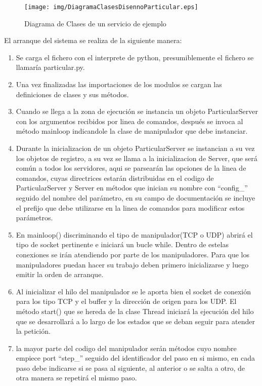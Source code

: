 \documentclass[a4paper,spanish,12pt]{book}
\begin{document}
\begin{figure}[h]
	\texttt{[image: img/DiagramaClasesDisennoParticular.eps]}
	\caption{Diagrama de Clases de un servicio de ejemplo} 
	      \label{fig:DiagramaClasesDiseñoParticular}
\end{figure}
El arranque del sistema se realiza de la siguiente manera:
\begin{enumerate}
	\item Se carga el fichero con el interprete de python, presumiblemente el fichero se llamaría particular.py.
	\item Una vez finalizadas las importaciones de los modulos se cargan las definiciones de clases y sus m\'etodos.
	\item Cuando se llega a la zona de ejecución se instancia un objeto ParticularServer con los argumentos recibidos por linea de comandos, despu\'es se invoca al m\'etodo mainloop indicandole la clase de manipulador que debe instanciar.
	\item Durante la inicializacion de un objeto ParticularServer se instancian a su vez los objetos de registro, a su vez se llama a la inicializacion de Server, que será común a todos los servidores, aqui se parsearán las opciones de la linea de comandos, cuyas directrices estarán distribuidas en el codigo de ParticularServer y Server en m\'etodos que inician su nombre con ``config\_'' seguido del nombre del parámetro, en su campo de documentación se incluye el prefijo que debe utilizarse en la linea de comandos para modificar estos parámetros.
	\item En mainloop() discriminando el tipo de manipulador(TCP o UDP) abrirá el tipo de socket pertinente e iniciará un bucle while. Dentro de estelas conexiones se irán atendiendo por parte de los manipuladores. Para que los manipuladores puedan hacer su trabajo deben primero inicializarse y luego emitir la orden de arranque.
	\item Al inicializar el hilo del manipulador se le aporta bien el socket de conexión para los tipo TCP y el buffer y la dirección de origen para los UDP. El m\'etodo start() que se hereda de la clase Thread iniciará la ejecución del hilo que se desarrollará a lo largo de los estados que se deban seguir para atender la petición.
	\item la mayor parte del codigo del manipulador serán m\'etodos cuyo nombre empiece port ``step\_'' seguido del identificador del paso en si mismo, en cada paso debe indicarse si se pasa al siguiente, al anterior o se salta a otro, de otra manera se repetirá el mismo paso.
\end{enumerate}
\end{document}
